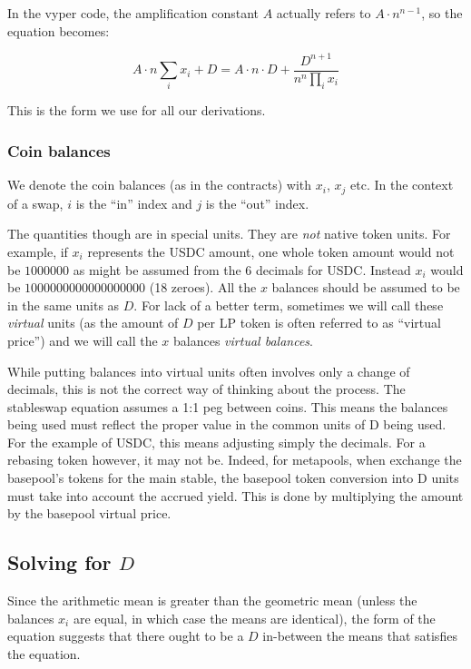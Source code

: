 \documentclass[
]{article}
\begin{document}
In the vyper code, the amplification constant \(A\) actually refers to
\(A \cdot n^{n-1}\), so the equation becomes:

\[ A \cdot n  \sum_i x_i + D = A \cdot n \cdot D + \frac{D^{n+1}}{n^n \prod_i x_i}\]

This is the form we use for all our derivations.

\hypertarget{coin-balances}{%
\subsubsection{Coin balances}\label{coin-balances}}

We denote the coin balances (as in the contracts) with \(x_i\), \(x_j\)
etc. In the context of a swap, \(i\) is the ``in'' index and \(j\) is
the ``out'' index.

The quantities though are in special units. They are \emph{not} native
token units. For example, if \(x_i\) represents the USDC amount, one
whole token amount would not be \(1000000\) as might be assumed from the
6 decimals for USDC. Instead \(x_i\) would be \(1000000000000000000\)
(18 zeroes). All the \(x\) balances should be assumed to be in the same
units as \(D\). For lack of a better term, sometimes we will call these
\emph{virtual} units (as the amount of \(D\) per LP token is often
referred to as ``virtual price'') and we will call the \(x\) balances
\emph{virtual balances}.

While putting balances into virtual units often involves only a change
of decimals, this is not the correct way of thinking about the process.
The stableswap equation assumes a 1:1 peg between coins. This means the
balances being used must reflect the proper value in the common units of
D being used. For the example of USDC, this means adjusting simply the
decimals. For a rebasing token however, it may not be. Indeed, for
metapools, when exchange the basepool's tokens for the main stable, the
basepool token conversion into D units must take into account the
accrued yield. This is done by multiplying the amount by the basepool
virtual price.

\hypertarget{solving-for-d}{%
\subsection{\texorpdfstring{Solving for
\(D\)}{Solving for D}}\label{solving-for-d}}

Since the arithmetic mean is greater than the geometric mean (unless the
balances \(x_i\) are equal, in which case the means are identical), the
form of the equation suggests that there ought to be a \(D\) in-between
the means that satisfies the equation.
\end{document}
